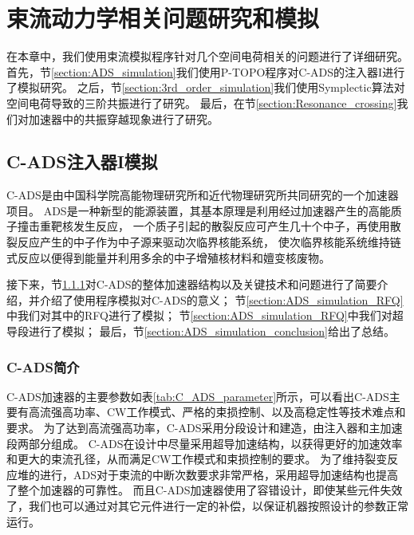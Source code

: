 \chapter{束流动力学相关问题研究和模拟} \label{chap:Simulation}
在本章中，我们使用束流模拟程序针对几个空间电荷相关的问题进行了详细研究。
首先，节\eqref{section:ADS_simulation}我们使用P-TOPO程序对C-ADS的注入器I进行了模拟研究。
之后，节\eqref{section:3rd_order_simulation}我们使用Symplectic算法对空间电荷导致的三阶共振进行了研究。
最后，在节\eqref{section:Resonance_crossing}我们对加速器中的共振穿越现象进行了研究。

\section{C-ADS注入器I模拟}        \label{section:ADS_simulation}
C-ADS是由中国科学院高能物理研究所和近代物理研究所共同研究的一个加速器项目\cite{zhihuili2011ADS,fang2014physics,fang2016instability}。
ADS是一种新型的能源装置，其基本原理是利用经过加速器产生的高能质子撞击重靶核发生反应，
一个质子引起的散裂反应可产生几十个中子，再使用散裂反应产生的中子作为中子源来驱动次临界核能系统，
使次临界核能系统维持链式反应以便得到能量并利用多余的中子增殖核材料和嬗变核废物。

接下来，节\ref{section:ADS_simulation_introduction}对C-ADS的整体加速器结构以及关键技术和问题进行了简要介绍，并介绍了使用程序模拟对C-ADS的意义；
节\ref{section:ADS_simulation_RFQ}中我们对其中的RFQ进行了模拟；
节\ref{section:ADS_simulation_RFQ}中我们对超导段进行了模拟；
最后，节\ref{section:ADS_simulation_conclusion}给出了总结。

\subsection{C-ADS简介}  \label{section:ADS_simulation_introduction}
C-ADS加速器的主要参数如表\eqref{tab:C_ADS_parameter}所示\cite{zhihuili2011ADS}，可以看出C-ADS主要有高流强高功率、CW工作模式、严格的束损控制、以及高稳定性等技术难点和要求。
为了达到高流强高功率，C-ADS采用分段设计和建造，由注入器和主加速段两部分组成。
C-ADS在设计中尽量采用超导加速结构，以获得更好的加速效率和更大的束流孔径，从而满足CW工作模式和束损控制的要求。
为了维持裂变反应堆的进行，ADS对于束流的中断次数要求非常严格，采用超导加速结构也提高了整个加速器的可靠性。
而且C-ADS加速器使用了容错设计，即使某些元件失效了，我们也可以通过对其它元件进行一定的补偿，以保证机器按照设计的参数正常运行。

